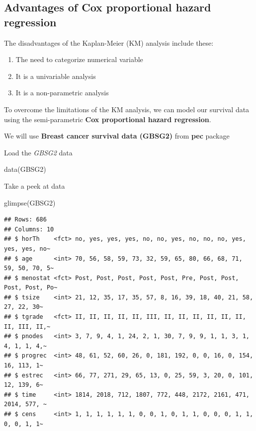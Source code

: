 \documentclass[
]{book}
\makeatletter
\newenvironment{Shaded}{\begin{snugshade}}{\end{snugshade}}
\newcommand{\FunctionTok}[1]{\textcolor[rgb]{0,0,0}{#1}}
\newcommand{\NormalTok}[1]{#1}
\providecommand{\tightlist}{%
  \setlength{\itemsep}{0pt}\setlength{\parskip}{0pt}}
\newenvironment{kframe}{%
\medskip{}
\setlength{\fboxsep}{.8em}
 \def\at@end@of@kframe{}%
 \ifinner\ifhmode%
  \def\at@end@of@kframe{\end{minipage}}%
  \begin{minipage}{\columnwidth}%
 \fi\fi%
 \def\FrameCommand##1{\hskip\@totalleftmargin \hskip-\fboxsep
 \colorbox{shadecolor}{##1}\hskip-\fboxsep
     \hskip-\linewidth \hskip-\@totalleftmargin \hskip\columnwidth}%
 \MakeFramed {\advance\hsize-\width
   \@totalleftmargin\z@ \linewidth\hsize
   \@setminipage}}%
 {\par\unskip\endMakeFramed%
 \at@end@of@kframe}
\renewenvironment{Shaded}{\begin{kframe}}{\end{kframe}}
\makeatother
\begin{document}
\hypertarget{advantages-of-cox-proportional-hazard-regression}{%
\subsection{Advantages of Cox proportional hazard regression}\label{advantages-of-cox-proportional-hazard-regression}}

The disadvantages of the Kaplan-Meier (KM) analysis include these:

\begin{enumerate}
\def\labelenumi{\arabic{enumi}.}
\tightlist
\item
  The need to categorize numerical variable
\item
  It is a univariable analysis
\item
  It is a non-parametric analysis
\end{enumerate}

To overcome the limitations of the KM analysis, we can model our survival data using the semi-parametric \textbf{Cox proportional hazard regression}.

We will use \textbf{Breast cancer survival data (GBSG2)} from \textbf{pec} package

Load the \emph{GBSG2} data

\begin{Shaded}
\begin{Highlighting}[]
\FunctionTok{data}\NormalTok{(GBSG2)}
\end{Highlighting}
\end{Shaded}

Take a peek at data

\begin{Shaded}
\begin{Highlighting}[]
\FunctionTok{glimpse}\NormalTok{(GBSG2)}
\end{Highlighting}
\end{Shaded}

\begin{verbatim}
## Rows: 686
## Columns: 10
## $ horTh    <fct> no, yes, yes, yes, no, no, yes, no, no, no, yes, yes, yes, no~
## $ age      <int> 70, 56, 58, 59, 73, 32, 59, 65, 80, 66, 68, 71, 59, 50, 70, 5~
## $ menostat <fct> Post, Post, Post, Post, Post, Pre, Post, Post, Post, Post, Po~
## $ tsize    <int> 21, 12, 35, 17, 35, 57, 8, 16, 39, 18, 40, 21, 58, 27, 22, 30~
## $ tgrade   <fct> II, II, II, II, II, III, II, II, II, II, II, II, II, III, II,~
## $ pnodes   <int> 3, 7, 9, 4, 1, 24, 2, 1, 30, 7, 9, 9, 1, 1, 3, 1, 4, 1, 1, 4,~
## $ progrec  <int> 48, 61, 52, 60, 26, 0, 181, 192, 0, 0, 16, 0, 154, 16, 113, 1~
## $ estrec   <int> 66, 77, 271, 29, 65, 13, 0, 25, 59, 3, 20, 0, 101, 12, 139, 6~
## $ time     <int> 1814, 2018, 712, 1807, 772, 448, 2172, 2161, 471, 2014, 577, ~
## $ cens     <int> 1, 1, 1, 1, 1, 1, 0, 0, 1, 0, 1, 1, 0, 0, 0, 1, 1, 0, 0, 1, 1~
\end{verbatim}
\end{document}
